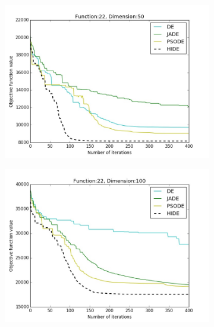 \documentclass[a4paper,twoside]{article}
\begin{document}
\begin{figure}[h!]
\begin{subfigure}[b]{0.24\textwidth}
        \includegraphics[width=\textwidth,natwidth=800,natheight=600]{plot_50D_F22_save}
        \caption{}
    \end{subfigure}
    \begin{subfigure}[b]{0.24\textwidth}
        \includegraphics[width=\textwidth,natwidth=800,natheight=600]{plot_100D_F22_save}
        \caption{}
    \end{subfigure}


\end{figure}
\end{document}
